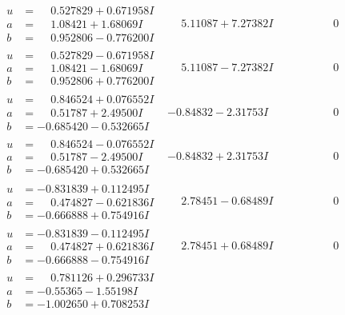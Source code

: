 \documentclass[1p]{elsarticle_modified}
\theoremstyle{definition}
\begin{document}
$$\begin{array}{c|c|c}
\begin{aligned}
u &= \phantom{-}0.527829 + 0.671958 I \\
a &= \phantom{-}1.08421 + 1.68069 I \\
b &= \phantom{-}0.952806 - 0.776200 I\end{aligned}
 & \phantom{-}5.11087 + 7.27382 I & \phantom{-0.000000 } 0 \\ \hline\begin{aligned}
u &= \phantom{-}0.527829 - 0.671958 I \\
a &= \phantom{-}1.08421 - 1.68069 I \\
b &= \phantom{-}0.952806 + 0.776200 I\end{aligned}
 & \phantom{-}5.11087 - 7.27382 I & \phantom{-0.000000 } 0 \\ \hline\begin{aligned}
u &= \phantom{-}0.846524 + 0.076552 I \\
a &= \phantom{-}0.51787 + 2.49500 I \\
b &= -0.685420 - 0.532665 I\end{aligned}
 & -0.84832 - 2.31753 I & \phantom{-0.000000 } 0 \\ \hline\begin{aligned}
u &= \phantom{-}0.846524 - 0.076552 I \\
a &= \phantom{-}0.51787 - 2.49500 I \\
b &= -0.685420 + 0.532665 I\end{aligned}
 & -0.84832 + 2.31753 I & \phantom{-0.000000 } 0 \\ \hline\begin{aligned}
u &= -0.831839 + 0.112495 I \\
a &= \phantom{-}0.474827 - 0.621836 I \\
b &= -0.666888 + 0.754916 I\end{aligned}
 & \phantom{-}2.78451 - 0.68489 I & \phantom{-0.000000 } 0 \\ \hline\begin{aligned}
u &= -0.831839 - 0.112495 I \\
a &= \phantom{-}0.474827 + 0.621836 I \\
b &= -0.666888 - 0.754916 I\end{aligned}
 & \phantom{-}2.78451 + 0.68489 I & \phantom{-0.000000 } 0 \\ \hline\begin{aligned}
u &= \phantom{-}0.781126 + 0.296733 I \\
a &= -0.55365 - 1.55198 I \\
b &= -1.002650 + 0.708253 I\end{aligned}

\end{array}$$
\end{document}
